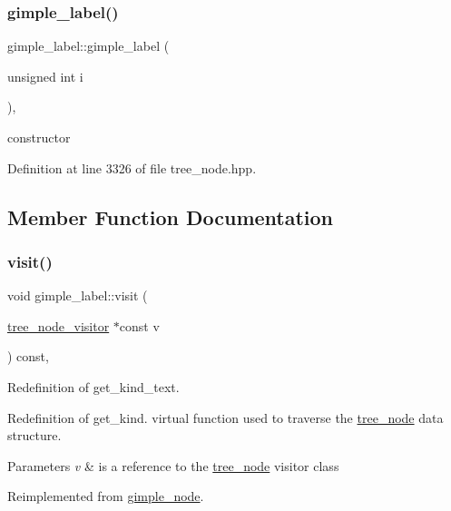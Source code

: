 \subsubsection{\texorpdfstring{gimple\+\_\+label()}{gimple\_label()}}
{\footnotesize\ttfamily gimple\+\_\+label\+::gimple\+\_\+label (\begin{DoxyParamCaption}\item[{unsigned int}]{i }\end{DoxyParamCaption})\hspace{0.3cm}{\ttfamily [inline]}, {\ttfamily [explicit]}}



constructor 



Definition at line 3326 of file tree\+\_\+node.\+hpp.



\subsection{Member Function Documentation}
\mbox{\label{structgimple__label_a7948e2a870e18e9a7c7d8a722a6fa26b}} 
\subsubsection{\texorpdfstring{visit()}{visit()}}
{\footnotesize\ttfamily void gimple\+\_\+label\+::visit (\begin{DoxyParamCaption}\item[{\hyperlink{classtree__node__visitor}{tree\+\_\+node\+\_\+visitor} $\ast$const}]{v }\end{DoxyParamCaption}) const\hspace{0.3cm}{\ttfamily [override]}, {\ttfamily [virtual]}}



Redefinition of get\+\_\+kind\+\_\+text. 

Redefinition of get\+\_\+kind. virtual function used to traverse the \hyperlink{classtree__node}{tree\+\_\+node} data structure. 
\begin{DoxyParams}{Parameters}
{\em v} & is a reference to the \hyperlink{classtree__node}{tree\+\_\+node} visitor class \\
\hline
\end{DoxyParams}


Reimplemented from \hyperlink{structgimple__node_a337b029a3aca9c1b96311b6e6668f7f3}{gimple\+\_\+node}.



